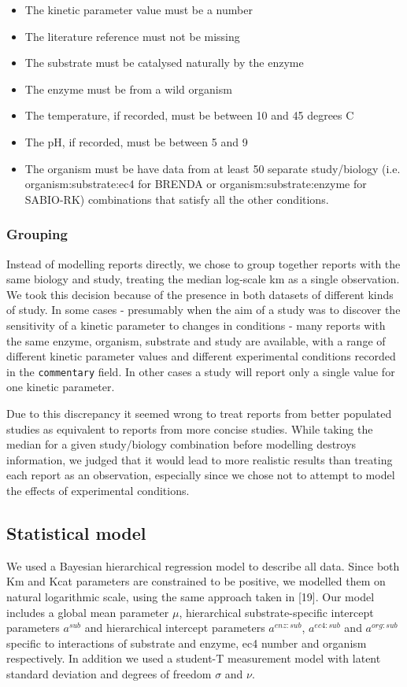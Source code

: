 \documentclass[11pt]{article}
\makeatletter
\newcommand{\citeprocitem}[2]{\hyper@linkstart{cite}{citeproc_bib_item_#1}#2\hyper@linkend}
\makeatother
\begin{document}
\begin{itemize}
\item The kinetic parameter value must be a number
\item The literature reference must not be missing
\item The substrate must be catalysed naturally by the enzyme
\item The enzyme must be from a wild organism
\item The temperature, if recorded, must be between 10 and 45 degrees C
\item The pH, if recorded, must be between 5 and 9
\item The organism must be have data from at least 50 separate study/biology
(i.e. organism:substrate:ec4 for BRENDA or organism:substrate:enzyme for
SABIO-RK) combinations that satisfy all the other conditions.
\end{itemize}

\subsubsection{Grouping}
\label{sec:orga809439}
Instead of modelling reports directly, we chose to group together reports with
the same biology and study, treating the median log-scale km as a single
observation. We took this decision because of the presence in both datasets of
different kinds of study. In some cases - presumably when the aim of a study was
to discover the sensitivity of a kinetic parameter to changes in conditions -
many reports with the same enzyme, organism, substrate and study are available,
with a range of different kinetic parameter values and different experimental
conditions recorded in the \texttt{commentary} field. In other cases a study will
report only a single value for one kinetic parameter.

Due to this discrepancy it seemed wrong to treat reports from better populated
studies as equivalent to reports from more concise studies. While taking the
median for a given study/biology combination before modelling destroys
information, we judged that it would lead to more realistic results than
treating each report as an observation, especially since we chose not to
attempt to model the effects of experimental conditions.

\subsection{Statistical model}
\label{sec:org880e178}
We used a Bayesian hierarchical regression model to describe all data. Since
both Km and Kcat parameters are constrained to be positive, we modelled them on
natural logarithmic scale, using the same approach taken in
\citeprocitem{19}{[19]}. Our model includes a global mean
parameter \(\mu\), hierarchical substrate-specific intercept parameters \(a^{sub}\)
and hierarchical intercept parameters \(a^{enz:sub}\), \(a^{ec4:sub}\) and
\(a^{org:sub}\) specific to interactions of substrate and enzyme, ec4 number and
organism respectively. In addition we used a student-T measurement model with
latent standard deviation and degrees of freedom \(\sigma\) and \(\nu\).
\end{document}
